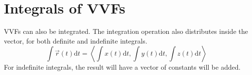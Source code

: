 \section{Integrals of VVFs}
VVFs can also be integrated.
The integration operation also distributes inside the vector, for both definite and indefinite integrals.
\begin{equation*}
	\int{\vec{r}(t)\mathrm{d}t} = \left<\int{x(t)\mathrm{d}t},\int{y(t)\mathrm{d}t},\int{z(t)\mathrm{d}t}\right>
\end{equation*}
For indefinite integrals, the result will have a vector of constants will be added.